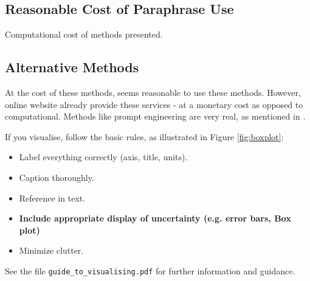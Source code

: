 \documentclass{l4proj}
\theoremstyle{definition}
\begin{document}
    \subsection{Reasonable Cost of Paraphrase Use}
        Computational cost of methods presented.
    \subsection{Alternative Methods}
        At the cost of these methods, seems reasonable to use these methods. However, online website already provide these services - at a monetary cost as opposed to computational. Methods like prompt engineering are very real, as mentioned in \citet{kirchenbauer2023watermark}.

If you visualise, follow the basic rules, as illustrated in Figure \ref{fig:boxplot}:
\begin{itemize}
\item Label everything correctly (axis, title, units).
\item Caption thoroughly.
\item Reference in text.
\item \textbf{Include appropriate display of uncertainty (e.g. error bars, Box plot)}
\item Minimize clutter.
\end{itemize}

See the file \texttt{guide\_to\_visualising.pdf} for further information and guidance.






\end{document}
